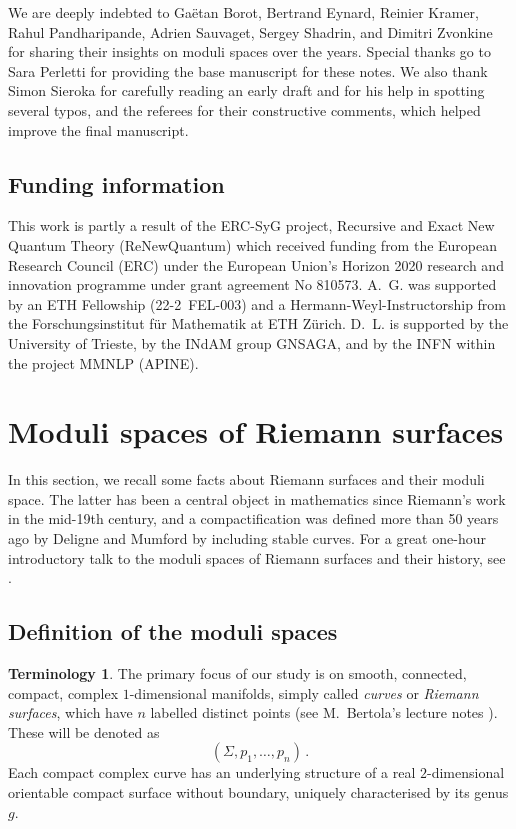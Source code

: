 \documentclass[11pt,reqno]{amsart}
\numberwithin{equation}{section}
\theoremstyle{plain}
\theoremstyle{definition}
\newtheorem*{terminology}{Terminology}
\begin{document}
We are deeply indebted to Gaëtan Borot, Bertrand Eynard, Reinier Kramer, Rahul Pandharipande, Adrien Sauvaget, Sergey Shadrin, and Dimitri Zvonkine for sharing their insights on moduli spaces over the years. Special thanks go to Sara Perletti for providing the base manuscript for these notes. We also thank Simon Sieroka for carefully reading an early draft and for his help in spotting several typos, and the referees for their constructive comments, which helped improve the final manuscript.

\subsection*{Funding information}
This work is partly a result of the ERC-SyG project, Recursive and Exact New Quantum Theory (ReNewQuantum) which received funding from the European Research Council (ERC) under the European Union's Horizon 2020 research and innovation programme under grant agreement No 810573. A.~G. was supported by an ETH Fellowship (22-2~FEL-003) and a Hermann-Weyl-Instructorship from the Forschungsinstitut für Mathematik at ETH Zürich. D.~L. is supported by the University of Trieste, by the INdAM group GNSAGA, and by the INFN within the project MMNLP (APINE).

\newpage
\section{Moduli spaces of Riemann surfaces}
\label{sec:moduli}

In this section, we recall some facts about Riemann surfaces and their moduli space. The latter has been a central object in mathematics since Riemann's work in the mid-19th century, and a compactification was defined more than 50 years ago by Deligne and Mumford \cite{DM69} by including stable curves. For a great one-hour introductory talk to the moduli spaces of Riemann surfaces and their history, see \cite{Pan18}.

\subsection{Definition of the moduli spaces}
\begin{terminology}
  The primary focus of our study is on smooth, connected, compact, complex $1$-dimensional manifolds, simply called \emph{curves} or \emph{Riemann surfaces}, which have $n$ labelled distinct points (see M.~Bertola's lecture notes \cite{Ber}). These will be denoted as
  \begin{equation}
    (\Sigma,p_1,\dots,p_n) \,.
  \end{equation}
  Each compact complex curve has an underlying structure of a real $2$-dimensional orientable compact surface without boundary, uniquely characterised by its genus $g$.
\end{terminology}
\end{document}
